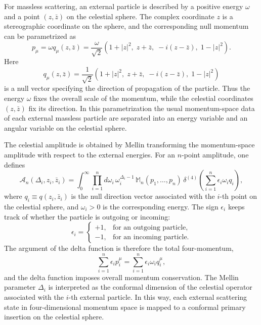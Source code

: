 {For massless scattering, an external particle is described by a positive energy \(\omega\) and a point \((z,\bar z)\) on the celestial sphere. The complex coordinate \(z\) is a stereographic coordinate on the sphere, and the corresponding null momentum can be parametrized as~\cite{Arkani-Hamed:2020gyp,Pasterski:2016qvg}
\begin{equation}
 p_\mu
 =
 \omega q_\mu(z,\bar z)
 =
 \frac{\omega}{\sqrt{2}}
 \left(
 1+|z|^2,\;
 z+\bar z,\;
 -i(z-\bar z),\;
 1-|z|^2
 \right).
\end{equation}
Here
\begin{equation}
 q_\mu(z,\bar z)
 =
 \frac{1}{\sqrt{2}}
 \left(
 1+|z|^2,\;
 z+\bar z,\;
 -i(z-\bar z),\;
 1-|z|^2
 \right)
\end{equation}
is a null vector specifying the direction of propagation of the particle. Thus the energy \(\omega\) fixes the overall scale of the momentum, while the celestial coordinates \((z,\bar z)\) fix its direction. In this parametrization the usual momentum-space data of each external massless particle are separated into an energy variable and an angular variable on the celestial sphere.

The celestial amplitude is obtained by Mellin transforming the momentum-space amplitude with respect to the external energies. For an \(n\)-point amplitude, one defines
\begin{equation}
    \mathcal{A}_n(\Delta_i,z_i,\bar z_i)
    =
    \int_0^\infty
    \prod_{i=1}^n
    d\omega_i\,\omega_i^{\Delta_i-1}\,
    \mathbb{M}_n(p_1,\ldots,p_n)\,
    \delta^{(4)}
    \left(
    \sum_{i=1}^n
    \epsilon_i\omega_i q_i
    \right),
\end{equation}
where \(q_i\equiv q(z_i,\bar z_i)\) is the null direction vector associated with the \(i\)-th point on the celestial sphere, and \(\omega_i>0\) is the corresponding energy. The sign \(\epsilon_i\) keeps track of whether the particle is outgoing or incoming:
\begin{equation}
    \epsilon_i =
    \begin{cases}
        +1, & \text{for an outgoing particle},\\
        -1, & \text{for an incoming particle}.
    \end{cases}
\end{equation}
The argument of the delta function is therefore the total four-momentum,
\begin{equation}
    \sum_{i=1}^n \epsilon_i p_i^\mu
    =
    \sum_{i=1}^n \epsilon_i \omega_i q_i^\mu,
\end{equation}
and the delta function imposes overall momentum conservation. The Mellin parameter \(\Delta_i\) is interpreted as the conformal dimension of the celestial operator associated with the \(i\)-th external particle. In this way, each external scattering state in four-dimensional momentum space is mapped to a conformal primary insertion on the celestial sphere.

}
